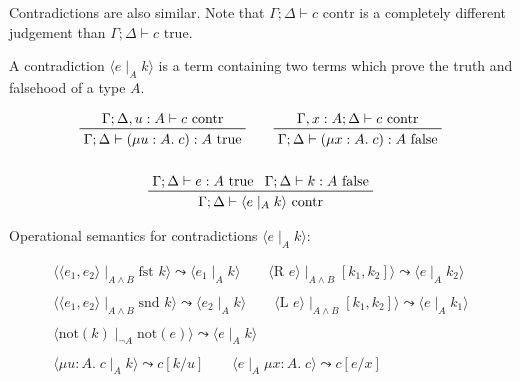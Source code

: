 \documentclass[11pt]{article}
\begin{document}
{{        Contradictions are also similar. Note that \(\Gamma;\Delta\vdash c\text{ contr}\) is a completely different
        judgement than \(\Gamma;\Delta\vdash c\text{ true}\).

        A contradiction \(\langle e \mid_A k \rangle\) is a term containing two terms which prove the truth and
        falsehood of a type \(A\).

        \begin{gather*}
        \prftree[r]{}
        {\Gamma;\Delta,u:A\vdash c\text{ contr}}
        {\Gamma;\Delta\vdash (\mu u:A.\;c):A\text{ true}}
        \qquad
        \prftree[r]{}
        {\Gamma,x:A;\Delta\vdash c\text{ contr}}
        {\Gamma;\Delta\vdash (\mu x:A.\;c):A\text{ false}}
        \\
        \\
        \prftree[r]{}
        {\Gamma;\Delta\vdash e:A \text{ true}}
        {\Gamma;\Delta\vdash k:A \text{ false}}
        {\Gamma;\Delta\vdash \langle e \mid_A k \rangle \text{ contr}}
        \\
        \end{gather*}

        Operational semantics for contradictions \(\langle e \mid_A k \rangle\):

        \begin{gather*}
        \langle\langle e_1,e_2 \rangle \mid_{A \wedge B} \text{fst }k\rangle \leadsto \langle e_1 \mid_A k \rangle
        \qquad
        \langle \text{R }e \rangle \mid_{A \wedge B} [k_1,k_2] \rangle \leadsto \langle e \mid_A k_2 \rangle
        \\
        \\
        \langle\langle e_1,e_2 \rangle \mid_{A \wedge B} \text{snd }k\rangle \leadsto \langle e_2 \mid_A k \rangle
        \qquad
        \langle \text{L }e \rangle \mid_{A \wedge B} [k_1,k_2] \rangle \leadsto \langle e \mid_A k_1 \rangle
        \\
        \\
        \langle \text{not}(k) \mid_{\neg A} \text{not}(e) \rangle \leadsto \langle e \mid_A k \rangle
        \\
        \\
        \langle \mu u:A.\;c \mid_A k \rangle \leadsto c[k/u]
        \qquad
        \langle e \mid_A \mu x:A.\;c \rangle \leadsto c[e/x]
        \end{gather*}

}}
\end{document}
